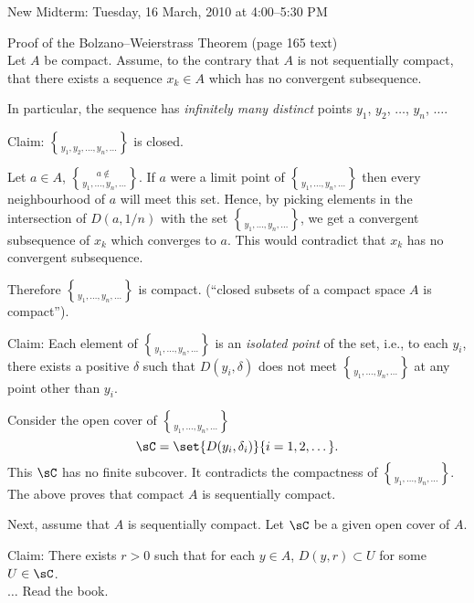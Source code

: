 New Midterm: Tuesday, 16 March, 2010 at 4:00--5:30 PM

Proof of the Bolzano--Weierstrass Theorem (page 165 text) \\
Let $A$ be compact.  Assume, to the contrary that $A$ is not sequentially compact, that there exists a sequence $x_k\in A$ which has no convergent subsequence.

In particular, the sequence has \emph{infinitely many distinct} points $y_1$, $y_2$, $\dotsc$, $y_n$, $\dotsc$.

Claim: $\brace{y_1,y_2,\dotsc,y_n,\dotsc}$ is closed.

\pf Let $a\in A$, $a\notin\brace{y_1,\dotsc,y_n,\dotsc}$.  If $a$ were a limit point of $\brace{y_1,\dotsc,y_n,\dotsc}$ then every neighbourhood of $a$ will meet this set.  Hence, by picking elements %
in the intersection of $D(a,1/n)$ with the set $\brace{y_1,\dotsc,y_n,\dotsc}$, we get a convergent subsequence of $x_k$ which converges to $a$.  This would contradict that $x_k$ has no convergent subsequence. %

Therefore $\brace{y_1,\dotsc,y_n,\dotsc}$ is compact. (``closed subsets of a compact space $A$ is compact'').

Claim: Each element of $\brace{y_1,\dotsc,y_n,\dotsc}$ is an \emph{isolated point} of the set, i.e., to each $y_i$, there exists a positive $\delta$ such that $D(y_i,\delta)$ does not meet $\brace{y_1,\dotsc,y_n,\dotsc}$ at any point other than $y_i$.

Consider the open cover of $\brace{y_1,\dotsc,y_n,\dotsc}$
\[ \sC = \set{D(y_i,\delta_i)}{i=1,2,\dotsc} . \]
This $\sC$ has no finite subcover.  It contradicts the compactness of $\brace{y_1,\dotsc,y_n,\dotsc}$.  The above proves that compact $A$ is sequentially compact.

Next, assume that $A$ is sequentially compact.  Let $\sC$ be a given open cover of $A$.

Claim: There exists $r>0$ such that for each $y\in A$, $D(y,r)\subset U$ for some $U\in\sC$. \\
$\ldots$ Read the book.
